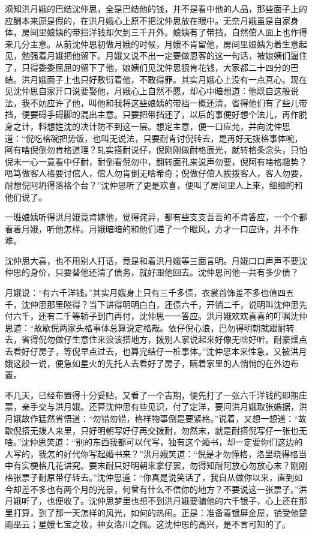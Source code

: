 \documentclass[12pt,UTF8]{ctexbook}
\begin{document}
{{{须知洪月娥的巴结沈仲思，全是巴结他的钱，并不是看中他的人品，那些面子上的应酬本来原是假的，在洪月娥心上原不把沈仲思放在眼中。无奈月娥虽是自家身体，房间里娘姨的带挡洋钱却欠到三千开外。娘姨有了带挡，自然倌人面上也作得来几分主意。从前沈仲思初做月娥的时候，月娥不肯留他，房间里娘姨为着生意起见，勉强着月娥把他留下。月娥又说不出一定要做恩客的这一句话，被娘姨们逼住了，只得委委屈屈的留下了他，娘姨们见沈仲思狠肯花钱，大家都二十四分的巴结。洪月娥面子上也只好敷衍着他，不敢得罪。其实月娥心上没有一点真心。现在见沈仲思自家开口说要娶他，月娥心上自然不愿，却心中暗想道：他既自这般说法，我不妨应许了他，叫他和我将这些娘姨的带挡一概还清，省得他们有了些儿带挡，便要碍手碍脚的混出主意。只要把带挡还了，以后的事便好想个法儿，再作脱身之计，料想姓沈的决计防不到这一层。想定主意，便一口应允，并向沈仲思道：“倪吃格碗把势饭，也叫无说法，只要耐肯讨倪转去，是再好无拨格事体啘，阿有啥倪倒勿肯格道理？轧实搭耐说仔，倪刚刚做耐格辰光，就转格条念头，只怕倪末一心一意看中仔耐，耐倒看倪勿中，翻转面孔来说声勿要，倪阿有啥格趣势？唔笃做客人格要讨倌人，倌人勿肯倒无啥希奇；倪做仔倌人挨拨客人，客人勿要，耐想倪阿坍得落格个台？”沈仲思听了更是欢喜，便叫了房间里人上来，细细的和他们说了。

一班娘姨听得洪月娥竟肯嫁他，觉得诧异，都有些支支吾吾的不肯答应，一个个都看着月娥，听他怎样。月娥暗暗的和他们递了一个眼风，方才一口应许，并不作难。

沈仲思大喜，也不用别人打话，竟是和着洪月娥等三面言明。月娥口口声声不要沈仲思的身价，只要替他还清了债务，就好跟他回去。沈仲思问他一共有多少债？

月娥说：“有六千洋钱。”其实月娥身上只有三千多债，衣裳首饰差不多也值四五千，沈仲思那里晓得？当下讲得明明白白，还债六千，开销二千，说明叫沈仲思先付六千，还有二千等轿子到门再付，沈仲思一一答应。洪月娥欢欢喜喜的叮嘱沈仲思道：“故歇倪两家头格事体总算说定格哉。依仔倪心浪，巴勿得明朝就跟耐转去，省得倪勿做仔生意住来浪该搭地方，拨别人家说起来好像无啥好听。耐豪燥点去看好仔房子，等倪早点过去，也算完结仔一桩事体。”沈仲思本来性急，又被洪月娥这般一说，便急如星火的先托人去看好了房子，瞒着家里的人悄悄的在外边布置。

不几天，已经布置得十分妥贴，又看了一个吉期，便先打了一张六千洋钱的即期庄票，亲手交与洪月娥。还算沈仲思有些见识，付了定洋，要问洪月娥取张婚据，洪月娥故作猛然省悟道：“勿错勿错，格样物事倒是要紧格。”说着，又想一想道：“故歇倪搭无拨人来里，只好明朝写好仔再交拨耐，勿然末，就是耐搭倪写仔一张也无啥。”沈仲思笑道：“别的东西我都可以代写，独有这个婚书，却一定要你们这边的人写的，我怎的好代你写起婚书来？”洪月娥笑道：“倪是才勿懂格，洛里晓得格当中有实梗格几花讲究。要末耐只好明朝来拿仔罢，勿得知耐阿放心勿放心末？刚刚格张票子耐原带仔转去。”沈仲思道：“你真是说笑话了，我自从做你以来，直到如今却差不多也有两个月的光景，何曾有什么不信你的地方？不要说这一张票子。”洪月娥听了，也便收了。沈仲思梦里也想不到洪月娥要骗他的六千银子，心上还在那里打算，到了那一天怎样的风光，如何的热闹。正是：准备着银屏金屋，销受他楚雨巫云；星娥七宝之妆，神女洛川之佩。这沈仲思的高兴，是不言可知的了。

}}}
\end{document}
